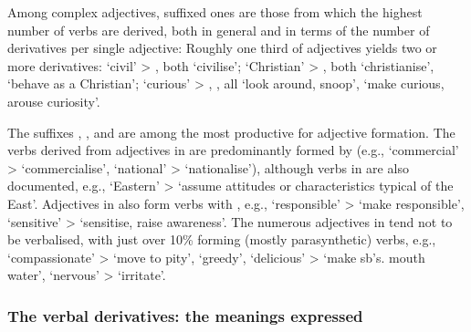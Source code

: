 \documentclass[output=paper,colorlinks,citecolor=brown]{langscibook}
\begin{document}
Among complex adjectives, suffixed ones are those from which the highest number of verbs are derived, both in general and in terms of the number of derivatives per single adjective: Roughly one third of adjectives yields two or more derivatives:  ‘civil’ > ,  both ‘civilise’;  ‘Christian’ > ,   both ‘christianise’,  ‘behave as a Christian’;  ‘curious’ > , ,  all ‘look around, snoop’,  ‘make curious, arouse curiosity’. 

The suffixes , , and  are among the most productive for adjective formation. The verbs derived from adjectives in  are predominantly formed by  (e.g.,  ‘commercial’ >  ‘commercialise’,  ‘national’ >  ‘nationalise’), although verbs in  are also documented, e.g.,  ‘Eastern’ >  ‘assume attitudes or characteristics typical of the East’. Adjectives in  also form verbs with , e.g.,  ‘responsible’ >  ‘make responsible’,  ‘sensitive’ >  ‘sensitise, raise awareness’. The numerous adjectives in  tend not to be verbalised, with just over 10\% forming (mostly parasynthetic) verbs, e.g.,  ‘compassionate’ >  ‘move to pity’,  ‘greedy’, ‘delicious’ >  ‘make sb's. mouth water’,  ‘nervous’ >  ‘irritate’.

\subsubsection{The verbal derivatives: the meanings expressed}
\label{sec:adj3}
\end{document}
